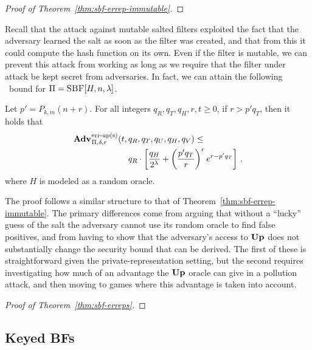 \begin{proof}[Proof of Theorem~\ref{thm:sbf-errep-immutable}]
  
\end{proof}


Recall that the attack against mutable salted filters exploited the fact that
the adversary learned the salt as soon as the filter was created, and that from
this it could compute the hash function on its own. Even if the filter is
mutable, we can prevent this attack from working as long as we require that the
filter under attack be kept secret from adversaries. In fact, we can attain the
following \erreps\ bound for $\Pi = \textnormal{\textsc{SBF}}[H,n,\lambda]$.

\begin{theorem}\label{thm:sbf-erreps}
  Let $p' = P_{k,m}(n+r)$.
  For all integers $q_R, q_T, q_H, r, t \geq 0$, if
  $r > p'q_T$, then it holds that
  \begin{eqnarray*}
    \begin{aligned}
      \Adv{\erreps}_{\Pi,\delta,r}(t,\,&q_R, q_T, q_U, q_H, q_V) \leq \\
          & q_R \cdot \left[
      \frac{q_H}{2^\lambda} +
      \left(\frac{p'q_T}{r}\right)^re^{r-p'q_T}\right]\,,
    \end{aligned}
\end{eqnarray*}
  where $H$ is modeled as a random oracle.
\end{theorem}

The proof follows a similar structure to that of
Theorem~\ref{thm:sbf-errep-immutable}. The primary differences come from arguing
that without a ``lucky'' guess of the salt the adversary cannot use its random
oracle to find false positives, and from having to show that the adversary's
access to $\textup{\textbf{Up}}\hspace{0.5pt}$ does not substantially change the security bound that can be
derived. The first of these is straightforward given the private-representation
setting, but the second requires investigating how much of an advantage the
$\textup{\textbf{Up}}\hspace{0.5pt}$ oracle can give in a pollution attack, and then moving to games where
this advantage is taken into account.

\begin{proof}[Proof of Theorem~\ref{thm:sbf-erreps}]
  
\end{proof}

\subsection{Keyed BFs}

